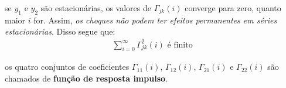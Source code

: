 \noindent
se $y_1$ e $y_2$ são estacionárias, os valores de $\Gamma_{jk}(i)$ converge para zero, quanto maior $i$ for. Assim, \textit{os choques não podem ter efeitos permanentes em séries estacionárias}. Disso segue que:
\begin{align*}
    \sum_{i=0}^\infty \Gamma_{jk}^2(i)  \text{ é finito}
\end{align*}

\noindent
os quatro conjuntos de coeficientes $\Gamma_{11}(i)$, $\Gamma_{12}(i)$, $\Gamma_{21}(i)$ e $\Gamma_{22}(i)$ são chamados de \textbf{função de resposta impulso}.

